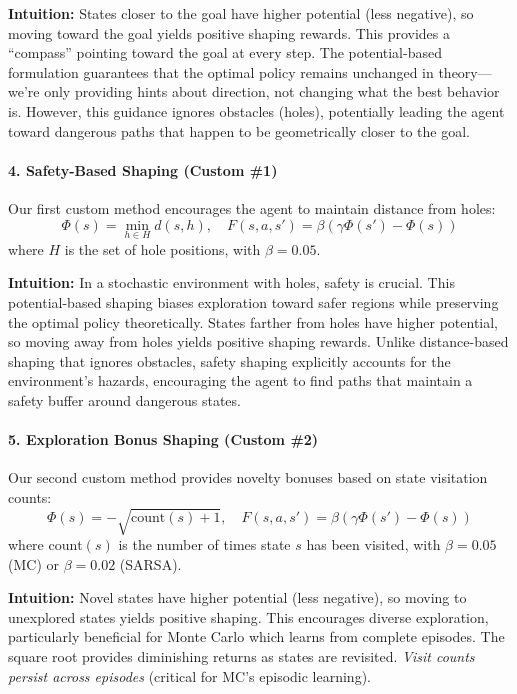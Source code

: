 \documentclass[11pt,a4paper]{article}
\begin{document}
\textbf{Intuition:} States closer to the goal have higher potential (less negative), so moving toward the goal yields positive shaping rewards. This provides a ``compass'' pointing toward the goal at every step. The potential-based formulation guarantees that the optimal policy remains unchanged in theory---we're only providing hints about direction, not changing what the best behavior is. However, this guidance ignores obstacles (holes), potentially leading the agent toward dangerous paths that happen to be geometrically closer to the goal.

\paragraph{4. Safety-Based Shaping (Custom \#1)}
Our first custom method encourages the agent to maintain distance from holes:
\begin{equation}
\Phi(s) = \min_{h \in H} d(s,h), \quad F(s,a,s') = \beta(\gamma\Phi(s') - \Phi(s))
\end{equation}
where $H$ is the set of hole positions, with $\beta = 0.05$.

\textbf{Intuition:} In a stochastic environment with holes, safety is crucial. This potential-based shaping biases exploration toward safer regions while preserving the optimal policy theoretically. States farther from holes have higher potential, so moving away from holes yields positive shaping rewards. Unlike distance-based shaping that ignores obstacles, safety shaping explicitly accounts for the environment's hazards, encouraging the agent to find paths that maintain a safety buffer around dangerous states.

\paragraph{5. Exploration Bonus Shaping (Custom \#2)}
Our second custom method provides novelty bonuses based on state visitation counts:
\begin{equation}
\Phi(s) = -\sqrt{\text{count}(s) + 1}, \quad F(s,a,s') = \beta(\gamma\Phi(s') - \Phi(s))
\end{equation}
where $\text{count}(s)$ is the number of times state $s$ has been visited, with $\beta = 0.05$ (MC) or $\beta = 0.02$ (SARSA).

\textbf{Intuition:} Novel states have higher potential (less negative), so moving to unexplored states yields positive shaping. This encourages diverse exploration, particularly beneficial for Monte Carlo which learns from complete episodes. The square root provides diminishing returns as states are revisited. \emph{Visit counts persist across episodes} (critical for MC's episodic learning).
\end{document}
